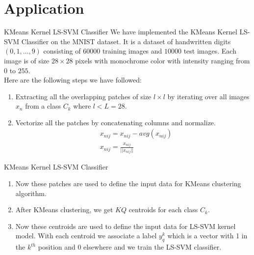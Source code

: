 \documentclass{beamer}
\newcounter{saveenumi}
\newcommand{\seti}{\setcounter{saveenumi}{\value{enumi}}}
\newcommand{\conti}{\setcounter{enumi}{\value{saveenumi}}}
\begin{document}
    \section{Application}
    \begin{frame}{KMeans Kernel LS-SVM Classifier}
        We have implemented the KMeans Kernel LS-SVM Classifier on the MNIST dataset.
        It is a dataset of handwritten digits $(0,1,\ldots,9)$ consisting of $60000$ training images and $10000$ test images. Each image is of size $28 \times 28$ pixels with monochrome color with intensity ranging from $0$ to $255$. \\ \quad Here are the following steps we have followed: \\
        \begin{enumerate}
            \item Extracting all the overlapping patches of size $l \times l$ by iterating over all images $x_{n}$ from a class $C_{k}$ where $l<L=28$.
            \item Vectorize all the patches by concatenating columns and normalize.
            \begin{align*}
                & x_{nij} = x_{nij} - avg(x_{nij}) \\
                & x_{nij} = \frac{x_{nij}}{||x_{nij}||}
            \end{align*}
            \seti
        \end{enumerate}
    \end{frame}
    \begin{frame}{KMeans Kernel LS-SVM Classifier}
        \begin{enumerate}
            \conti
            \item Now these patches are used to define the input data for KMeans clustering algorithm.
            \item After KMeans clustering, we get $KQ$ centroids for each class $C_{k}$.
            \item Now these centroids are used to define the input data for LS-SVM kernel model. With each centroid we associate a label $y_{q}^{k}$ which is a vector with 1 in the $k^{th}$ position and $0$ elsewhere and we train the LS-SVM classifier.
        \end{enumerate}
    \end{frame}
\end{document}
